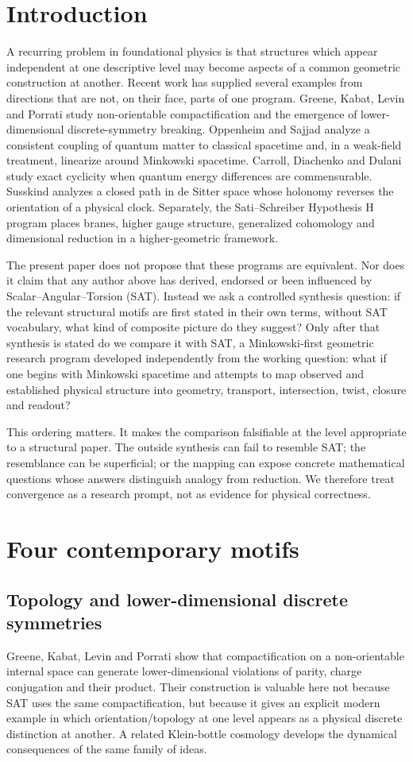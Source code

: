 \documentclass[11pt]{article}
\begin{document}
\section{Introduction}
A recurring problem in foundational physics is that structures which appear independent at one descriptive level may become aspects of a common geometric construction at another. Recent work has supplied several examples from directions that are not, on their face, parts of one program. Greene, Kabat, Levin and Porrati study non-orientable compactification and the emergence of lower-dimensional discrete-symmetry breaking. Oppenheim and Sajjad analyze a consistent coupling of quantum matter to classical spacetime and, in a weak-field treatment, linearize around Minkowski spacetime. Carroll, Diachenko and Dulani study exact cyclicity when quantum energy differences are commensurable. Susskind analyzes a closed path in de Sitter space whose holonomy reverses the orientation of a physical clock. Separately, the Sati--Schreiber Hypothesis H program places branes, higher gauge structure, generalized cohomology and dimensional reduction in a higher-geometric framework.

The present paper does not propose that these programs are equivalent. Nor does it claim that any author above has derived, endorsed or been influenced by Scalar--Angular--Torsion (SAT). Instead we ask a controlled synthesis question: if the relevant structural motifs are first stated in their own terms, without SAT vocabulary, what kind of composite picture do they suggest? Only after that synthesis is stated do we compare it with SAT, a Minkowski-first geometric research program developed independently from the working question: what if one begins with Minkowski spacetime and attempts to map observed and established physical structure into geometry, transport, intersection, twist, closure and readout?

This ordering matters. It makes the comparison falsifiable at the level appropriate to a structural paper. The outside synthesis can fail to resemble SAT; the resemblance can be superficial; or the mapping can expose concrete mathematical questions whose answers distinguish analogy from reduction. We therefore treat convergence as a research prompt, not as evidence for physical correctness.

\section{Four contemporary motifs}
\subsection{Topology and lower-dimensional discrete symmetries}
Greene, Kabat, Levin and Porrati show that compactification on a non-orientable internal space can generate lower-dimensional violations of parity, charge conjugation and their product. Their construction is valuable here not because SAT uses the same compactification, but because it gives an explicit modern example in which orientation/topology at one level appears as a physical discrete distinction at another. A related Klein-bottle cosmology develops the dynamical consequences of the same family of ideas.
\end{document}

